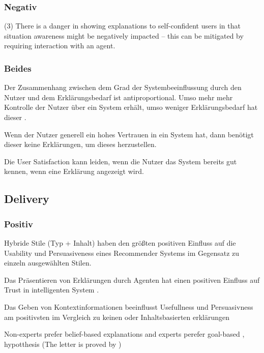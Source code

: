 \subsubsection*{Negativ}

(3) There is a danger in showing explanations to self-confident users in that situation awareness might be negatively impacted – this can be mitigated by requiring interaction with an agent. \cite{schaffer_i_2019}

\subsubsection*{Beides}

Der Zusammenhang zwischen dem Grad der Systembeeinflussung durch den Nutzer und dem Erklärungsbedarf ist antiproportional. Umso mehr mehr Kontrolle der Nutzer über ein System erhält, umso weniger Erklärungsbedarf hat dieser \cite{rosenfeld_explainability_2019}.

Wenn der Nutzer generell ein hohes Vertrauen in ein System hat, dann benötigt dieser keine Erklärungen, um dieses herzustellen. \cite{rosenfeld_explainability_2019, doshi2017towards}

Die User Satisfaction kann leiden, wenn die Nutzer das System bereits gut kennen, wenn eine Erklärung angezeigt wird.

\subsection*{Delivery}

\subsubsection*{Positiv}

Hybride Stile (Typ + Inhalt) haben den größten positiven Einfluss auf die Usability und Persuasiveness eines Recommender Systems im Gegensatz zu einzeln ausgewählten Stilen. \cite{sato_action-triggering_2019, kunkel_let_2019, sato_action-triggering_2019, schrills_color_2020, lim_2009_assessing}

Das Präsentieren von Erklärungen durch Agenten hat einen positiven Einfluss auf Trust in intelligenten System \cite{weitz_you_2019}.

Das Geben von Kontextinformationen beeinflusst Usefullness und Persuasivness am positivsten im Vergleich zu keinen oder Inhaltsbasierten erklärungen \cite{sato_action-triggering_2019}

Non-experts prefer belief-based explanations and experts perefer goal-based \cite{kaptein_personalised_2017}, hypotthesis (The letter is proved by \cite{martin_evaluating_2021})


